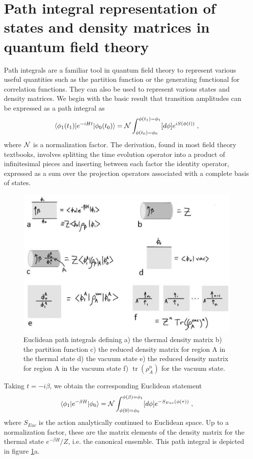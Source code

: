 \documentclass[12pt,epsf]{article}
\newcommand{\be}{\begin{equation}}
\newcommand{\ee}{\end{equation}}
\newcommand{\tr}{\operatorname{tr}}
\begin{document}
\section{Path integral representation of states and density matrices in quantum field theory}\label{AppPI}

Path integrals are a familiar tool in quantum field theory to represent various useful quantities such as the partition function or the generating functional for correlation functions. They can also be used to represent various states and density matrices. We begin with the basic result that transition amplitudes can be expressed as a path integral as
\be
\langle \phi_1(t_1) | e^{-i H t} | \phi_0(t_0) \rangle = {\cal N} \int_{\phi(t_0) = \phi_0}^{\phi(t_1) = \phi_1} [d \phi] e^{i S(\phi(t))} \; ,
\ee
where ${\cal N}$ is a normalization factor. The derivation, found in most field theory textbooks, involves splitting the time evolution operator into a product of infinitesimal pieces and inserting between each factor the identity operator, expressed as a sum over the projection operators associated with a complete basis of states.

\begin{figure}
\centering
\includegraphics[width=\textwidth]{pathint.eps}
\caption{Euclidean path integrals defining a) the thermal density matrix b) the partition function c) the reduced density matrix for region A in the thermal state d) the vacuum state e) the reduced density matrix for region A in the vacuum state f) $\tr(\rho_A^n)$ for the vacuum state.}
\label{pathint}
\end{figure}

Taking $t = -i \beta$, we obtain the corresponding Euclidean statement
\be
\label{euctime}
\langle \phi_1 | e^{- \beta H} | \phi_0 \rangle = {\cal N} \int_{\phi(0) = \phi_0}^{\phi(\beta) = \phi_1} [d \phi] e^{- S_{Euc}(\phi(\tau))} \; ,
\ee
where $S_{Euc}$ is the action analytically continued to Euclidean space. Up to a normalization factor, these are the matrix elements of the density matrix for the thermal state $e^{-\beta H}/Z$, i.e. the canonical ensemble. This path integral is depicted in figure \ref{pathint}a.
\end{document}
